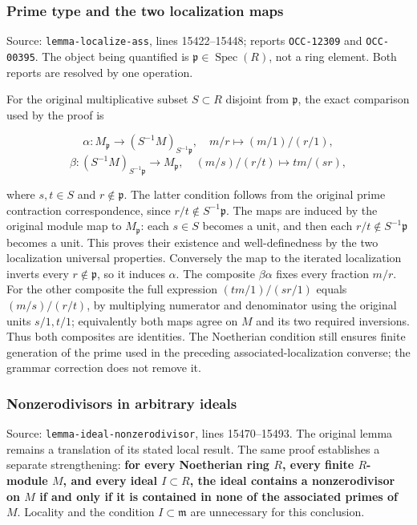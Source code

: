 \subsubsection{Prime type and the two localization maps}\label{algebra-proof-004-prime-type-and-the-two-localization-maps}

Source: \texttt{lemma-\AlgebraIdentifierBreak{}localize-\AlgebraIdentifierBreak{}ass}, lines 15422--15448; reports \texttt{OCC-12309} and \texttt{OCC-00395}. The object being quantified is \(\mathfrak p\in\operatorname{Spec}(R)\), not a ring element. Both reports are resolved by one operation.

For the original multiplicative subset \(S\subset R\) disjoint from \(\mathfrak p\), the exact comparison used by the proof is

\[
\alpha:M_{\mathfrak p}\longrightarrow(S^{-1}M)_{S^{-1}\mathfrak p},
\quad m/r\longmapsto(m/1)/(r/1),
\] \[
\beta:(S^{-1}M)_{S^{-1}\mathfrak p}\longrightarrow M_{\mathfrak p},
\quad (m/s)/(r/t)\longmapsto tm/(sr),
\]

where \(s,t\in S\) and \(r\notin\mathfrak p\). The latter condition follows from the original prime contraction correspondence, since \(r/t\notin S^{-1}\mathfrak p\). The maps are induced by the original module map to \(M_{\mathfrak p}\): each \(s\in S\) becomes a unit, and then each \(r/t\notin S^{-1}\mathfrak p\) becomes a unit. This proves their existence and well-definedness by the two localization universal properties. Conversely the map to the iterated localization inverts every \(r\notin\mathfrak p\), so it induces \(\alpha\). The composite \(\beta\alpha\) fixes every fraction \(m/r\). For the other composite the full expression \((tm/1)/(sr/1)\) equals \((m/s)/(r/t)\), by multiplying numerator and denominator using the original units \(s/1,t/1\); equivalently both maps agree on \(M\) and its two required inversions. Thus both composites are identities. The Noetherian condition still ensures finite generation of the prime used in the preceding associated-localization converse; the grammar correction does not remove it.

\subsubsection{Nonzerodivisors in arbitrary ideals}\label{algebra-proof-004-nonzerodivisors-in-arbitrary-ideals}

Source: \texttt{lemma-\AlgebraIdentifierBreak{}ideal-\AlgebraIdentifierBreak{}nonzerodivis\AlgebraIdentifierBreak{}or}, lines 15470--15493. The original lemma remains a translation of its stated local result. The same proof establishes a separate strengthening: \textbf{for every Noetherian ring \(R\), every finite \(R\)-module \(M\), and every ideal \(I\subset R\), the ideal contains a nonzerodivisor on \(M\) if and only if it is contained in none of the associated primes of \(M\)}. Locality and the condition \(I\subset\mathfrak m\) are unnecessary for this conclusion.

